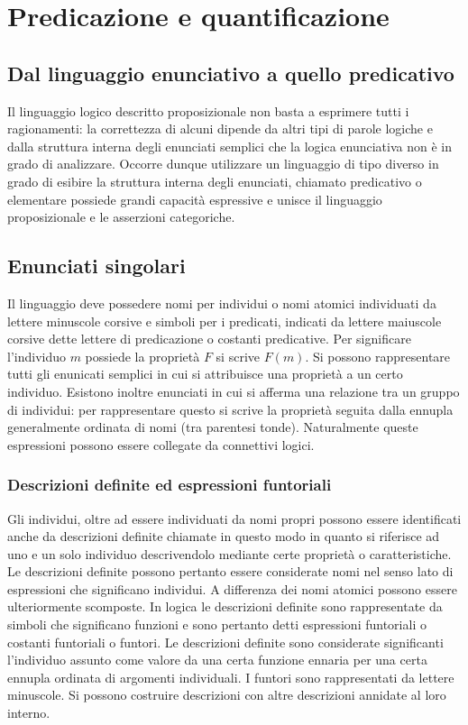 \chapter{Predicazione e quantificazione}
\section{Dal linguaggio enunciativo a quello predicativo}
Il linguaggio logico descritto proposizionale non basta a esprimere tutti i ragionamenti: la correttezza di alcuni dipende da altri tipi di parole logiche e dalla struttura interna degli enunciati semplici che la logica 
enunciativa non \`e in grado di analizzare. Occorre dunque utilizzare un linguaggio di tipo diverso in grado di esibire la struttura interna degli enunciati, chiamato predicativo o elementare possiede grandi 
capacit\`a espressive e unisce il linguaggio proposizionale e le asserzioni categoriche. 
\section{Enunciati singolari}
Il linguaggio deve possedere nomi per individui o nomi atomici individuati da lettere minuscole corsive e simboli per i predicati, indicati da lettere maiuscole corsive dette lettere di predicazione o costanti 
predicative. Per significare l'individuo $m$ possiede la propriet\`a $F$ si scrive $F(m)$. Si possono rappresentare tutti gli enunicati semplici in cui si attribuisce una propriet\`a a un certo individuo. Esistono 
inoltre enunciati in cui si afferma una relazione tra un gruppo di individui: per rappresentare questo si scrive la propriet\`a seguita dalla ennupla generalmente ordinata di nomi (tra parentesi tonde). 
Naturalmente queste espressioni possono essere collegate da connettivi logici. 
\subsection{Descrizioni definite ed espressioni funtoriali}
Gli individui, oltre ad essere individuati da nomi propri possono essere identificati anche da descrizioni definite chiamate in questo modo in quanto si riferisce ad uno e un solo individuo descrivendolo mediante 
certe propriet\`a o caratteristiche. Le descrizioni definite possono pertanto essere considerate nomi nel senso lato di espressioni che significano individui. A differenza dei nomi atomici possono essere 
ulteriormente scomposte. In logica le descrizioni definite sono rappresentate da simboli che significano funzioni e sono pertanto detti espressioni funtoriali o costanti funtoriali o funtori. Le descrizioni definite 
sono considerate significanti l'individuo assunto come valore da una certa funzione ennaria per una certa ennupla ordinata di argomenti individuali. I funtori sono rappresentati da lettere minuscole. Si possono 
costruire descrizioni con altre descrizioni annidate al loro interno. 
